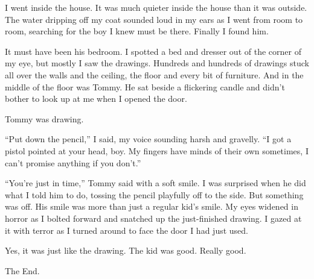 I went inside the house. It was much quieter inside the house than
it was outside. The water dripping off my coat sounded loud in my
ears as I went from room to room, searching for the boy I knew must
be there. Finally I found him.



It must have been his bedroom. I spotted a bed and dresser out of
the corner of my eye, but mostly I saw the drawings. Hundreds and
hundreds of drawings stuck all over the walls and the ceiling, the
floor and every bit of furniture. And in the middle of the floor
was Tommy. He sat beside a flickering candle and didn't
bother to look up at me when I opened the door.



Tommy was drawing.



``Put down the pencil,'' I said, my voice sounding harsh
and gravelly. ``I got a pistol pointed at your head, boy. My
fingers have minds of their own sometimes, I can't promise
anything if you don't.''



``You're just in time,'' Tommy said with a soft
smile. I was surprised when he did what I told him to do, tossing
the pencil playfully off to the side. But something was off. His
smile was more than just a regular kid's smile. My eyes
widened in horror as I bolted forward and snatched up the
just-finished drawing. I gazed at it with terror as I turned around
to face the door I had just used.



Yes, it was just like the drawing. The kid was good. Really
good.



The End.
 



